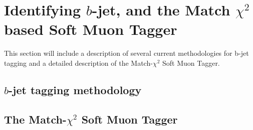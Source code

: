 \chapter{Identifying $b$-jet, and the Match $\chi^{2}$ based Soft Muon Tagger} \label{prt:smt_summary}
This section will include a description of several current methodologies for b-jet tagging
and a detailed description of the Match-$\chi^{2}$ Soft Muon Tagger.
\section{$b$-jet tagging methodology} \label{sec:b_jet_tagging_methodology}
\section{The Match-$\chi^{2}$ Soft Muon Tagger} \label{sec:smt_tagger}
